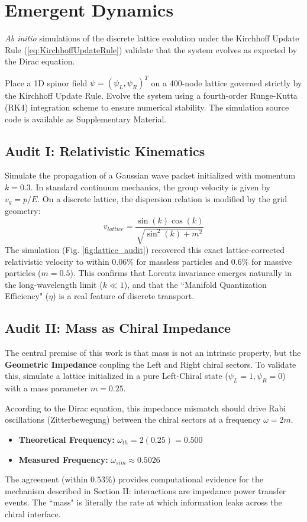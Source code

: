 \section{Emergent Dynamics}
\label{sec:EmergentDynamics}

\textit{Ab initio} simulations of the discrete lattice evolution  under the Kirchhoff Update Rule (\cref{eq:KirchhoffUpdateRule}) validate that the system evolves as expected by the Dirac equation.

Place a 1D spinor field $\psi = (\psi_L, \psi_R)^T$ on a 400-node lattice governed strictly by the Kirchhoff Update Rule. Evolve the system using a fourth-order Runge-Kutta (RK4) integration scheme to ensure numerical stability. The simulation source code is available as Supplementary Material.

\subsection{Audit I: Relativistic Kinematics}

Simulate the propagation of a Gaussian wave packet initialized with momentum $k=0.3$. In standard continuum mechanics, the group velocity is given by $v_g = p/E$. On a discrete lattice, the dispersion relation is modified by the grid geometry:
\begin{equation}
    v_{lattice} = \frac{\sin(k)\cos(k)}{\sqrt{\sin^2(k) + m^2}}
\end{equation}
The simulation (Fig. \ref{fig:lattice_audit}) recovered this exact lattice-corrected relativistic velocity to within $0.06\%$ for massless particles and $0.6\%$ for massive particles ($m=0.5$). This confirms that Lorentz invariance emerges naturally in the long-wavelength limit ($k \ll 1$), and that the ``Manifold Quantization Efficiency" ($\eta$) is a real feature of discrete transport.

\subsection{Audit II: Mass as Chiral Impedance}

The central premise of this work is that mass is not an intrinsic property, but the \textbf{Geometric Impedance} coupling the Left and Right chiral sectors. To validate this, simulate a lattice initialized in a pure Left-Chiral state ($\psi_L=1, \psi_R=0$) with a mass parameter $m=0.25$.

According to the Dirac equation, this impedance mismatch should drive Rabi oscillations (Zitterbewegung) between the chiral sectors at a frequency $\omega = 2m$.
\begin{itemize}
    \item \textbf{Theoretical Frequency:} $\omega_{th} = 2(0.25) = 0.500$
    \item \textbf{Measured Frequency:} $\omega_{sim} \approx 0.5026$
\end{itemize}
The agreement (within $0.53\%$) provides computational evidence for the mechanism described in Section II: interactions are impedance power transfer events. The ``mass" is literally the rate at which information leaks across the chiral interface.

